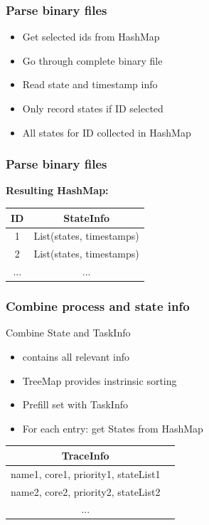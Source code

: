\documentclass{beamer}
\begin{document}
\begin{frame}
	\frametitle{Parse binary files}
	\begin{block}{}
		\begin{itemize}
			\item Get selected ids from HashMap 
			\item Go through complete binary file
			\item Read state and timestamp info
			\item Only record states if ID selected
			\item All states for ID collected in HashMap
		\end{itemize}
	\end{block}
\end{frame}

\begin{frame}
	\frametitle{Parse binary files}
	\textbf{Resulting HashMap:}\\
	\vspace{1cm}
\begin{tabular}{|c|c|}
		\hline 
		\textbf{ID} & \textbf{StateInfo}  \\
		\hline 
		1 & List(states, timestamps) \\
		\hline 
		2 & List(states, timestamps)  \\ 
		\hline 
		... & ...  \\ 
		\hline 
	\end{tabular}
\end{frame}

\begin{frame}
	\frametitle{Combine process and state info}
	\begin{block}{Combine State and TaskInfo}
		\begin{itemize}
			\item contains all relevant info
			\item TreeMap provides instrinsic sorting
			\item Prefill set with TaskInfo
			\item For each entry: get States from HashMap
		\end{itemize}
	\end{block}
	\vspace{2mm}
	\begin{tabular}{|c|c|}
		\hline 
		\textbf{TraceInfo}  \\
		\hline 
		name1, core1, priority1, stateList1 \\
		\hline 
		name2, core2, priority2, stateList2  \\ 
		\hline 
		...  \\ 
		\hline 
	\end{tabular}
\end{frame}
\end{document}
